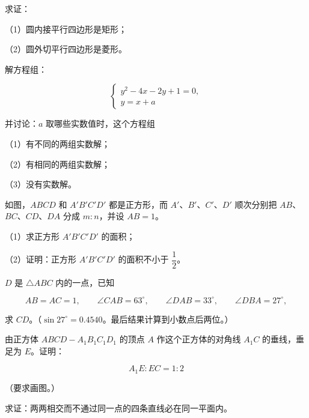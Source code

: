 \begin{question}
求证：

（1）圆内接平行四边形是矩形；

（2）圆外切平行四边形是菱形。

\end{question}
\begin{question}
解方程组：

\nopagebreak[4]
\[
\begin{cases}
y^2-4x-2y+1=0,\\
y=x+a
\end{cases}
\]

并讨论：$a$ 取哪些实数值时，这个方程组

（1）有不同的两组实数解；

（2）有相同的两组实数解；

（3）没有实数解。

\Needspace{0.4\textheight}
\end{question}
\begin{question}
如图，$ABCD$ 和 $A'B'C'D'$ 都是正方形，而 $A'$、$B'$、$C'$、$D'$ 顺次分别把 $AB$、$BC$、$CD$、$DA$ 分成 $m:n$，并设 $AB=1$。
\nopagebreak[4]
\begin{center}\end{center}
\nopagebreak[4]
（1）求正方形 $A'B'C'D'$ 的面积；

（2）证明：正方形 $A'B'C'D'$ 的面积不小于 $\dfrac12$。

\end{question}
\begin{question}
$D$ 是 $\triangle ABC$ 内的一点，已知

\nopagebreak[4]
\[
AB=AC=1,\qquad \angle CAB=63^\circ,
\qquad \angle DAB=33^\circ,\qquad \angle DBA=27^\circ,
\]

求 $CD$。（$\sin27^\circ=0.4540$。最后结果计算到小数点后两位。）

\end{question}
\begin{question}
由正方体 $ABCD-A_1B_1C_1D_1$ 的顶点 $A$ 作这个正方体的对角线 $A_1C$ 的垂线，垂足为 $E$。证明：

\nopagebreak[4]
\[
A_1E:EC=1:2
\]

（要求画图。）

\end{question}
\begin{question}
求证：两两相交而不通过同一点的四条直线必在同一平面内。

\end{question}
